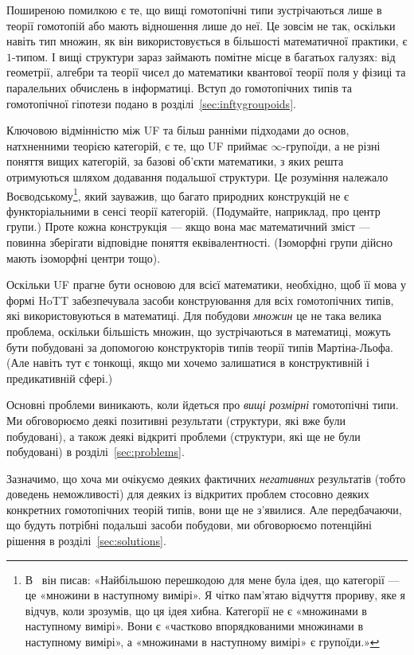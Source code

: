 \documentclass[12pt]{article}
\begin{document}
Поширеною помилкою є те, що вищі гомотопічні типи зустрічаються лише в теорії гомотопій або мають відношення лише до неї. Це зовсім не так, оскільки навіть тип множин, як він використовується в більшості математичної практики, є $1$-типом. І вищі структури зараз займають помітне місце в багатьох галузях: від геометрії, алгебри та теорії чисел до математики квантової теорії поля у фізиці та паралельних обчислень в інформатиці. Вступ до гомотопічних типів та гомотопічної гіпотези подано в розділі~\ref{sec:inftygroupoids}.

Ключовою відмінністю між UF та більш ранніми підходами до основ, натхненними теорією категорій, є те, що UF приймає $\infty$-групоїди, а не різні поняття вищих категорій, за базові об'єкти математики, з яких решта отримуються шляхом додавання подальшої структури. Це розуміння належало Воєводському\footnote{В~\cite{Voevodsky2014} він писав: «Найбільшою перешкодою для мене була ідея, що категорії — це «множини в наступному вимірі». Я чітко пам’ятаю відчуття прориву, яке я відчув, коли зрозумів, що ця ідея хибна. Категорії не є «множинами в наступному вимірі». Вони є «частково впорядкованими множинами в наступному вимірі», а «множинами в наступному вимірі» є групоїди.»}, який зауважив, що багато природних конструкцій не є функторіальними в сенсі теорії категорій. (Подумайте, наприклад, про центр групи.) Проте кожна конструкція — якщо вона має математичний зміст — повинна зберігати відповідне поняття еквівалентності. (Ізоморфні групи дійсно мають ізоморфні центри тощо).

Оскільки UF прагне бути основою для всієї математики, необхідно, щоб її мова у формі HoTT забезпечувала засоби конструювання для всіх гомотопічних типів, які використовуються в математиці. Для побудови \emph{множин} це не така велика проблема, оскільки більшість множин, що зустрічаються в математиці, можуть бути побудовані за допомогою конструкторів типів теорії типів Мартіна-Льофа. (Але навіть тут є тонкощі, якщо ми хочемо залишатися в конструктивній і предикативній сфері.)

Основні проблеми виникають, коли йдеться про \emph{вищі розмірні} гомотопічні типи. Ми обговорюємо деякі позитивні результати (структури, які вже були побудовані), а також деякі відкриті проблеми (структури, які ще не були побудовані) в розділі~\ref{sec:problems}.

Зазначимо, що хоча ми очікуємо деяких фактичних \emph{негативних} результатів (тобто доведень неможливості) для деяких із відкритих проблем стосовно деяких конкретних гомотопічних теорій типів, вони ще не з'явилися. Але передбачаючи, що будуть потрібні подальші засоби побудови, ми обговорюємо потенційні рішення в розділі~\ref{sec:solutions}.
\end{document}
